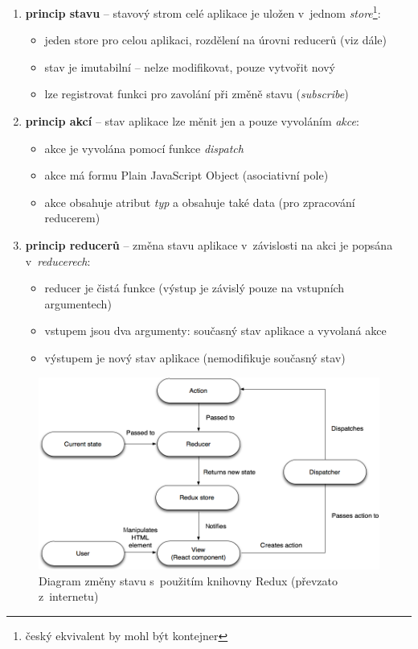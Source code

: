 \begin{enumerate}
  \item \textbf{princip stavu} -- stavový strom celé aplikace je uložen v~jednom \textit{store}\footnote{český ekvivalent by mohl být kontejner}:
    \begin{itemize}
      \item jeden store pro celou aplikaci, rozdělení na úrovni reducerů (viz dále)
      \item stav je imutabilní -- nelze modifikovat, pouze vytvořit nový
      \item lze registrovat funkci pro zavolání při změně stavu (\textit{subscribe})
    \end{itemize}
  \item \textbf{princip akcí} --  stav aplikace lze měnit jen a pouze vyvoláním \textit{akce}:
    \begin{itemize}
      \item akce je vyvolána pomocí funkce \textit{dispatch}
      \item akce má formu Plain JavaScript Object (asociativní pole)
      \item akce obsahuje atribut \textit{typ} a obsahuje také data (pro zpracování reducerem)
    \end{itemize}
  \item \textbf{princip reducerů} -- změna stavu aplikace v~závislosti na akci je popsána v~\textit{reducerech}:
    \begin{itemize}
      \item reducer je čistá funkce (výstup je závislý pouze na vstupních argumentech)
      \item vstupem jsou dva argumenty: současný stav aplikace a vyvolaná akce
      \item výstupem je nový stav aplikace (nemodifikuje současný stav)
    \end{itemize}
\end{enumerate}


\begin{figure}[!htb]
  \centering
  \includegraphics[width=14cm]{img/redux.png}
  \caption{Diagram změny stavu s~použitím knihovny Redux (převzato z~internetu)}
\end{figure}

